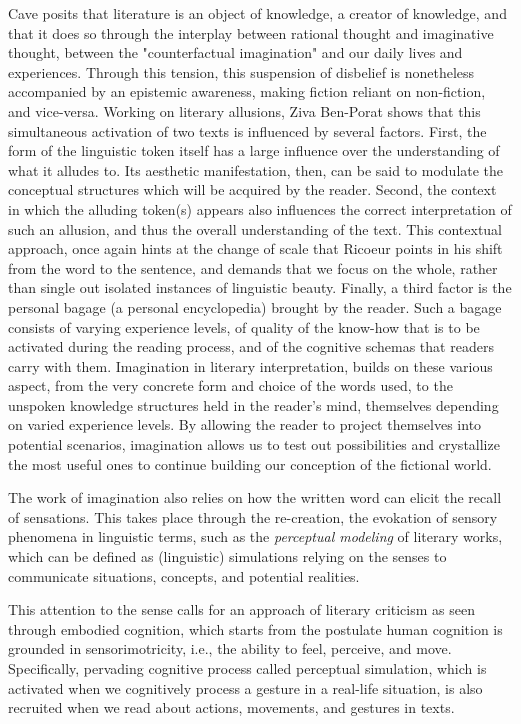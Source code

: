 Cave posits that literature is an object of knowledge, a creator of knowledge, and that it does so through the interplay between rational thought and imaginative thought, between the "counterfactual imagination" and our daily lives and experiences. Through this tension, this suspension of disbelief is nonetheless accompanied by an epistemic awareness, making fiction reliant on non-fiction, and vice-versa. Working on literary allusions, Ziva Ben-Porat shows that this simultaneous activation of two texts is influenced by several factors. First, the form of the linguistic token itself has a large influence over the understanding of what it alludes to. Its aesthetic manifestation, then, can be said to modulate the conceptual structures which will be acquired by the reader. Second, the context in which the alluding token(s) appears also influences the correct interpretation of such an allusion, and thus the overall understanding of the text. This contextual approach, once again hints at the change of scale that Ricoeur points in his shift from the word to the sentence, and demands that we focus on the whole, rather than single out isolated instances of linguistic beauty. Finally, a third factor is the personal bagage (a personal encyclopedia) brought by the reader. Such a bagage consists of varying experience levels, of quality of the know-how that is to be activated during the reading process, and of the cognitive schemas that readers carry with them. Imagination in literary interpretation, builds on these various aspect, from the very concrete form and choice of the words used, to the unspoken knowledge structures held in the reader's mind, themselves depending on varied experience levels. By allowing the reader to project themselves into potential scenarios, imagination allows us to test out possibilities and crystallize the most useful ones to continue building our conception of the fictional world.

The work of imagination also relies on how the written word can elicit the recall of sensations. This takes place through the re-creation, the evokation of sensory phenomena in linguistic terms, such as the \emph{perceptual modeling} of literary works, which can be defined as (linguistic) simulations relying on the senses to communicate situations, concepts, and potential realities.

This attention to the sense calls for an approach of literary criticism as seen through embodied cognition, which starts from the postulate human cognition is grounded in sensorimotricity, i.e., the ability to feel, perceive, and move. Specifically, pervading cognitive process called perceptual simulation, which is activated when we cognitively process a gesture in a real-life situation, is also recruited when we read about actions, movements, and gestures in texts.

